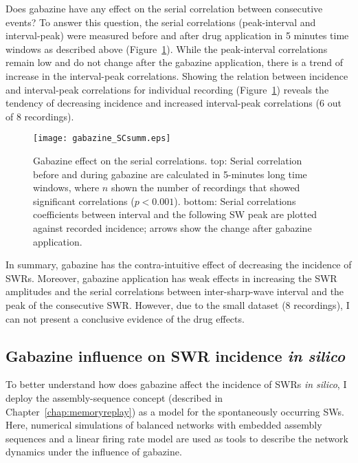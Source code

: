     Does gabazine have any effect on the serial correlation between consecutive
    events? To answer this question, the serial correlations (peak-interval and
    interval-peak) were measured before and after drug application in 5 minutes
    time windows as described above (Figure~\ref{fig:gabazine_SCsumm}). While
    the peak-interval correlations remain low and do not change after the
    gabazine application, there is a trend of increase in the interval-peak
    correlations. Showing the relation between incidence and interval-peak
    correlations for individual recording (Figure~\ref{fig:gabazine_SCsumm})
    reveals the tendency of decreasing incidence and increased interval-peak
    correlations (6 out of 8 recordings).

    \begin{figure}
      \texttt{[image: gabazine\_SCsumm.eps]}
      \caption{
        Gabazine effect on the serial correlations. top: Serial correlation
        before and during gabazine are calculated in 5-minutes long time
        windows, where $n$ shown the number of recordings that showed
        significant correlations ($p<0.001$). bottom: Serial correlations
        coefficients between interval and the following SW peak are plotted
        against recorded incidence; arrows show the change after gabazine
        application.
             }
    \label{fig:gabazine_SCsumm}
    \end{figure}

    In summary, gabazine has the contra-intuitive effect of decreasing the
    incidence of SWRs. Moreover, gabazine application has weak effects in
    increasing the SWR amplitudes and the serial correlations between
    inter-sharp-wave interval and the peak of the consecutive SWR. However, due
    to the small dataset (8 recordings), I can not present a conclusive
    evidence of the drug effects.

  \subsection{Gabazine influence on SWR incidence {\textit {in silico} }}

    To better understand how does gabazine affect the incidence of SWRs
    {\textit {in silico}}, I deploy the assembly-sequence concept (described in
    Chapter~\ref{chap:memoryreplay}) as a model for the spontaneously occurring
    SWs. Here, numerical simulations of balanced networks with embedded assembly
    sequences and a linear firing rate model are used as tools to describe the
    network dynamics under the influence of gabazine.
      

